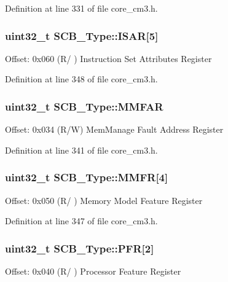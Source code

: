 Definition at line 331 of file core\+\_\+cm3.\+h.

\subsubsection[{\texorpdfstring{I\+S\+AR}{ISAR}}]{ uint32\+\_\+t S\+C\+B\+\_\+\+Type\+::\+I\+S\+AR\mbox{[}5\mbox{]}}\hypertarget{structSCB__Type_acee8e458f054aac964268f4fe647ea4f}{}\label{structSCB__Type_acee8e458f054aac964268f4fe647ea4f}
Offset\+: 0x060 (R/ ) Instruction Set Attributes Register 

Definition at line 348 of file core\+\_\+cm3.\+h.

\subsubsection[{\texorpdfstring{M\+M\+F\+AR}{MMFAR}}]{ uint32\+\_\+t S\+C\+B\+\_\+\+Type\+::\+M\+M\+F\+AR}\hypertarget{structSCB__Type_ac49b24b3f222508464f111772f2c44dd}{}\label{structSCB__Type_ac49b24b3f222508464f111772f2c44dd}
Offset\+: 0x034 (R/W) Mem\+Manage Fault Address Register 

Definition at line 341 of file core\+\_\+cm3.\+h.

\subsubsection[{\texorpdfstring{M\+M\+FR}{MMFR}}]{ uint32\+\_\+t S\+C\+B\+\_\+\+Type\+::\+M\+M\+FR\mbox{[}4\mbox{]}}\hypertarget{structSCB__Type_aec2f8283d2737c6897188568a4214976}{}\label{structSCB__Type_aec2f8283d2737c6897188568a4214976}
Offset\+: 0x050 (R/ ) Memory Model Feature Register 

Definition at line 347 of file core\+\_\+cm3.\+h.

\subsubsection[{\texorpdfstring{P\+FR}{PFR}}]{ uint32\+\_\+t S\+C\+B\+\_\+\+Type\+::\+P\+FR\mbox{[}2\mbox{]}}\hypertarget{structSCB__Type_a3f51c43f952f3799951d0c54e76b0cb7}{}\label{structSCB__Type_a3f51c43f952f3799951d0c54e76b0cb7}
Offset\+: 0x040 (R/ ) Processor Feature Register 

